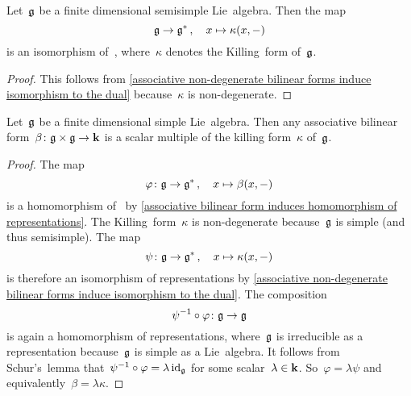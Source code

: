 \begin{lemma}
  \label{semisimple lie algebra identification with dual space}
  Let~$\glie$ be a finite dimensional semisimple Lie~algebra.
  Then the map
  \[
    \mathfrak{g}
    \to
    \mathfrak{g}^* \,,
    \quad
    x
    \mapsto
    \kappa(x,-)
  \]
  is an isomorphism of~{\representations{$\glie$}}, where~$\kappa$ denotes the Killing~form of~$\glie$.
\end{lemma}


\begin{proof}
  This follows from \cref{associative non-degenerate bilinear forms induce isomorphism to the dual} because~$\kappa$ is non-degenerate.
\end{proof}


\begin{corollary}
  Let~$\glie$ be a finite dimensional simple Lie~algebra.
  Then any associative bilinear form~$\beta \colon \mathfrak{g} \times \mathfrak{g} \to \mathbf{k}$ is a scalar multiple of the killing form~$\kappa$ of~$\glie$.
\end{corollary}


\begin{proof}
 The map
 \[
  \varphi
  \colon
  \mathfrak{g}
  \to
  \mathfrak{g}^* \,,
  \quad
  x
  \mapsto
  \beta(x, -)
 \]
 is a homomorphism of~{\representations{$\glie$}} by \cref{associative bilinear form induces homomorphism of representations}.
 The Killing~form~$\kappa$ is non-degenerate because~$\glie$ is simple (and thus semisimple).
 The map
 \[
  \psi
  \colon
  \mathfrak{g}
  \to
  \mathfrak{g}^* \,,
  \quad
  x
  \mapsto
  \kappa(x, -)
 \]
 is therefore an isomorphism of representations by \cref{associative non-degenerate bilinear forms induce isomorphism to the dual}.
 The composition
 \[
  \psi^{-1}
  \circ
  \varphi
  \colon
  \mathfrak{g}
  \to
  \mathfrak{g} 
 \]
 is again a homomorphism of representations, where~$\glie$ is irreducible as a representation because~$\glie$ is simple as a Lie~algebra.
 It follows from Schur’s~lemma that~$\psi^{-1} \circ \varphi = \lambda \operatorname{id}_{\mathfrak{g}}$ for some scalar~$\lambda \in \mathbf{k}$.
 So~$\varphi = \lambda \psi$ and equivalently~$\beta = \lambda \kappa$.
\end{proof}




